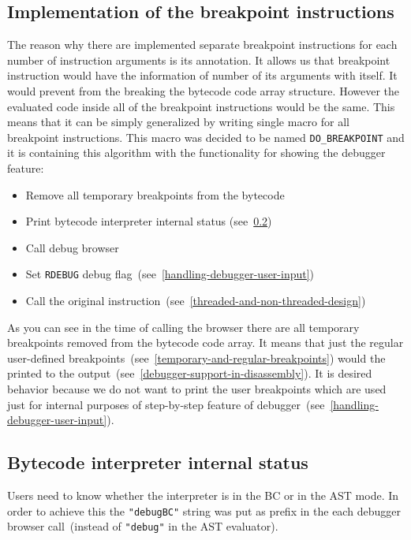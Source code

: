 \documentclass[thesis=M,english]{FITthesis}[2018/10/20]
\newcommand{\code}[1]{\texttt{#1}}
\begin{document}
\subsection{Implementation of the breakpoint instructions}\label{implementation-of-breakpoint-instruction}

The reason why there are implemented separate breakpoint instructions for each number of instruction arguments is its annotation. It allows us that breakpoint instruction would have the information of number of its arguments with itself. It would prevent from the breaking the bytecode code array structure. However the evaluated code inside all of the breakpoint instructions would be the same. This means that it can be simply generalized by writing single macro for all breakpoint instructions. This macro was decided to be named \code{DO{\_}BREAKPOINT} and it is containing this algorithm with the functionality for showing the debugger feature:

\begin{itemize}
	\item Remove all temporary breakpoints from the bytecode
	\item Print bytecode interpreter internal status (see~\ref{bytecode-interpreter-internal-status})
	\item Call debug browser
	\item Set \code{RDEBUG} debug flag~(see~\ref{handling-debugger-user-input})
	\item Call the original instruction~(see~\ref{threaded-and-non-threaded-design})
\end{itemize}

As you can see in the time of calling the browser there are all temporary breakpoints removed from the bytecode code array. It means that just the regular user-defined breakpoints~(see~\ref{temporary-and-regular-breakpoints}) would the printed to the output~(see~\ref{debugger-support-in-disassembly}). It is desired behavior because we do not want to print the user breakpoints which are used just for internal purposes of step-by-step feature of debugger~(see~\ref{handling-debugger-user-input}).

\subsection{Bytecode interpreter internal status}\label{bytecode-interpreter-internal-status}

Users need to know whether the interpreter is in the BC or in the AST mode. In order to achieve this the \code{"debugBC"} string was put as prefix in the each debugger browser call~(instead of \code{"debug"} in the AST evaluator).
\end{document}
